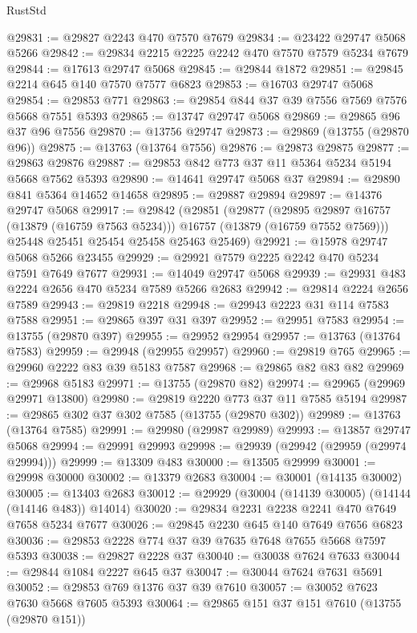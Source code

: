 \begin{lexlean}{RustStd}
\begin{coremodule}
@29831 := @29827 @2243 @470 @7570 @7679
@29834 := @23422 @29747 @5068 @5266
@29842 := @29834 @2215 @2225 @2242 @470 @7570 @7579 @5234 @7679
@29844 := @17613 @29747 @5068
@29845 := @29844 @1872
@29851 := @29845 @2214 @645 @140 @7570 @7577 @6823
@29853 := @16703 @29747 @5068
@29854 := @29853 @771
@29863 := @29854 @844 @37 @39 @7556 @7569 @7576 @5668 @7551 @5393
@29865 := @13747 @29747 @5068
@29869 := @29865 @96 @37 @96 @7556
@29870 := @13756 @29747
@29873 := @29869 (@13755 (@29870 @96))
@29875 := @13763 (@13764 @7556)
@29876 := @29873 @29875
@29877 := @29863 @29876
@29887 := @29853 @842 @773 @37 @11 @5364 @5234 @5194 @5668 @7562 @5393
@29890 := @14641 @29747 @5068 @37
@29894 := @29890 @841 @5364 @14652 @14658
@29895 := @29887 @29894
@29897 := @14376 @29747 @5068
@29917 := @29842
    (@29851
      (@29877
        (@29895 @29897 @16757 (@13879 (@16759 @7563 @5234)))
        @16757
        (@13879 (@16759 @7552 @7569)))
      @25448
      @25451
      @25454
      @25458
      @25463
      @25469)
@29921 := @15978 @29747 @5068 @5266 @23455
@29929 := @29921 @7579 @2225 @2242 @470 @5234 @7591 @7649 @7677
@29931 := @14049 @29747 @5068
@29939 := @29931 @483 @2224 @2656 @470 @5234 @7589 @5266 @2683
@29942 := @29814 @2224 @2656 @7589
@29943 := @29819 @2218
@29948 := @29943 @2223 @31 @114 @7583 @7588
@29951 := @29865 @397 @31 @397
@29952 := @29951 @7583
@29954 := @13755 (@29870 @397)
@29955 := @29952 @29954
@29957 := @13763 (@13764 @7583)
@29959 := @29948 (@29955 @29957)
@29960 := @29819 @765
@29965 := @29960 @2222 @83 @39 @5183 @7587
@29968 := @29865 @82 @83 @82
@29969 := @29968 @5183
@29971 := @13755 (@29870 @82)
@29974 := @29965 (@29969 @29971 @13800)
@29980 := @29819 @2220 @773 @37 @11 @7585 @5194
@29987 := @29865 @302 @37 @302 @7585 (@13755 (@29870 @302))
@29989 := @13763 (@13764 @7585)
@29991 := @29980 (@29987 @29989)
@29993 := @13857 @29747 @5068
@29994 := @29991 @29993
@29998 := @29939 (@29942 (@29959 (@29974 @29994)))
@29999 := @13309 @483
@30000 := @13505 @29999
@30001 := @29998 @30000
@30002 := @13379 @2683
@30004 := @30001 (@14135 @30002)
@30005 := @13403 @2683
@30012 := @29929 (@30004 (@14139 @30005) (@14144 (@14146 @483)) @14014)
@30020 := @29834 @2231 @2238 @2241 @470 @7649 @7658 @5234 @7677
@30026 := @29845 @2230 @645 @140 @7649 @7656 @6823
@30036 := @29853 @2228 @774 @37 @39 @7635 @7648 @7655 @5668 @7597 @5393
@30038 := @29827 @2228 @37
@30040 := @30038 @7624 @7633
@30044 := @29844 @1084 @2227 @645 @37
@30047 := @30044 @7624 @7631 @5691
@30052 := @29853 @769 @1376 @37 @39 @7610
@30057 := @30052 @7623 @7630 @5668 @7605 @5393
@30064 := @29865 @151 @37 @151 @7610 (@13755 (@29870 @151))

\end{coremodule}
\end{lexlean}
